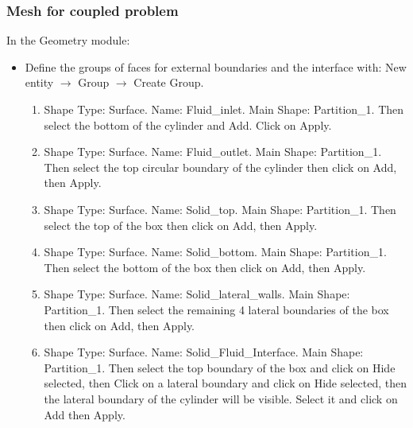 \documentclass[10pt, hyperref={unicode=true,pdfusetitle, bookmarks=true,bookmarksnumbered=false,bookmarksopen=false, breaklinks=false,pdfborder={0 0 1},backref=true,colorlinks=true,linkcolor=darkblue,pageanchor}]{beamer}
\begin{document}
\begin{frame}
\frametitle{Mesh for coupled problem}

\begin{block}{In the Geometry module:}
\begin{itemize}

 \item Define the groups of faces for external boundaries and the interface with: New entity $\rightarrow$ Group $\rightarrow$ Create Group.
 \begin{enumerate}
 \item Shape Type: Surface. Name: Fluid\_inlet. Main Shape: Partition\_1. Then select the bottom of the cylinder and Add. Click on Apply.
 \item Shape Type: Surface. Name: Fluid\_outlet. Main Shape: Partition\_1. Then select the top circular boundary of the cylinder then click on Add, then Apply.
 \item Shape Type: Surface. Name: Solid\_top. Main Shape: Partition\_1. Then select the top of the box then click on Add, then Apply.
 \item Shape Type: Surface. Name: Solid\_bottom. Main Shape: Partition\_1. Then select the bottom of the box then click on Add, then Apply.
 \item Shape Type: Surface. Name: Solid\_lateral\_walls. Main Shape: Partition\_1. Then select the remaining 4 lateral boundaries of the box then click on Add, then Apply.
 \item Shape Type: Surface. Name: Solid\_Fluid\_Interface. Main Shape: Partition\_1. Then select the top boundary of the box and click on Hide selected, then Click on a lateral boundary and click on Hide selected, then the lateral boundary of the cylinder will be visible. Select it and click on Add then Apply.
 \end{enumerate}
 
\end{itemize}
\end{block}

\end{frame}
\end{document}
